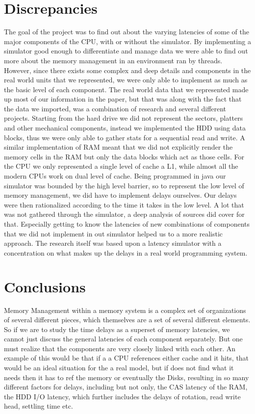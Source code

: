 \documentclass[12pt]{article}
\newcommand{\singlespace}{
  \protect\renewcommand\baselinestretch{1.0}
  \protect\normalsize
}
\begin{document}
\section{Discrepancies}
\label{sec:disc}

The goal of the project was to find out about the varying latencies of some of the major components of the CPU, with
or without the simulator. By implementing a simulator good enough to differentiate and manage data we were able to
find out more about the memory management in an environment ran by threads. However, since there exists some complex
and deep details and components in the real world units that we represented, we were only able to implement as much
as the basic level of each component.
The real world data that we represented made up most of our information in the paper, but that was along with the
fact that the data we imported, was a combination of research and several different projects.
Starting from the hard drive we did not represent the sectors, platters and other mechanical components, instead
we implemented the HDD using data blocks, thus we were only able to gather stats for a sequential read and write.
A similar implementation of RAM meant that we did not explicitly render the memory cells in the RAM but only the
data blocks which act as those cells.
For the CPU we only represented a single level of cache a L1, while almost all the modern CPUs work on dual level
of cache.
Being programmed in java our simulator was bounded by the high level barrier, so to represent the low
level of memory management, we did have to implement delays ourselves. Our delays were then rationalized according
to the time it takes in the low level. 
A lot that was not gathered through the simulator, a deep analysis of sources did cover for that. Especially getting
to know the latencies of new combinations of components that we did not implement in out simulator helped us to a
more realistic approach. The research itself was based upon a latency simulator with a concentration on what makes
up the delays in a real world programming system. 


\section{Conclusions} 

\label{sec:conclusions}

Memory Management within a memory system is a complex set of organizations of several different pieces, which
themselves are a set of several different elements. So if we are to study the time delays as a superset of
memory latencies, we cannot just discuss the general latencies of each component separately. But one must
realize that the components are very closely linked with each other. An example of this would be that if a
a CPU references either  cache and it hits, that would be an ideal situation for the a real model, but if does
not find what it needs then it has to ref the memory or eventually the Disks, resulting in so many different
factors for delays, including but not only, the CAS latency of the RAM, the HDD I/O latency, which further
includes the delays of rotation, read write head, settling time etc.


\singlespace



\end{document}
